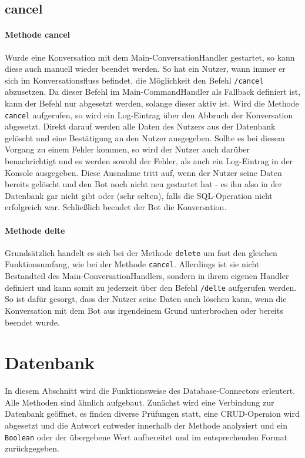         
        \subsection{cancel} \label{cancel.py}
            \paragraph{Methode cancel}
                Wurde eine Konversation mit dem Main-ConversationHandler gestartet, so kann diese auch manuell wieder beendet werden. So hat ein Nutzer, wann immer er sich im Konversationsfluss befindet, die Möglichkeit den Befehl \verb|/cancel| abzusetzen. Da dieser Befehl im Main-CommandHandler als Fallback definiert ist, kann der Befehl nur abgesetzt werden, solange dieser aktiv ist. Wird die Methode \verb|cancel| aufgerufen, so wird ein Log-Eintrag über den Abbruch der Konversation abgesetzt. Direkt darauf werden alle Daten des Nutzers aus der Datenbank gelöscht und eine Bestätigung an den Nutzer ausgegeben. Sollte es bei diesem Vorgang zu einem Fehler kommen, so wird der Nutzer auch darüber benachrichtigt und es werden sowohl der Fehler, als auch ein Log-Eintrag in der Konsole ausgegeben. Diese Ausnahme tritt auf, wenn der Nutzer seine Daten bereits gelöscht und den Bot noch nicht neu gestartet hat - es ihn also in der Datenbank gar nicht gibt oder (sehr selten), falls die SQL-Operation nicht erfolgreich war.
                Schließlich beendet der Bot die Konversation.

            \paragraph{Methode delte}
                Grundsätzlich handelt es sich bei der Methode \verb|delete| um fast den gleichen Funktionsumfang, wie bei der Methode \verb|cancel|. Allerdings ist sie nicht Bestandteil des Main-ConversationHandlers, sondern in ihrem eigenen Handler definiert und kann somit zu jederzeit über den Befehl \verb|/delte| aufgerufen werden. So ist dafür gesorgt, dass der Nutzer seine Daten auch löschen kann, wenn die Konversation mit dem Bot aus irgendeinem Grund unterbrochen oder bereits beendet wurde.


    \section{Datenbank} \label{Datenbank}

        In diesem Abschnitt wird die Funktionsweise des Database-Connectors erleutert. Alle Methoden sind ähnlich aufgebaut. Zunächst wird eine Verbindung zur Datenbank geöffnet, es finden diverse Prüfungen statt, eine CRUD-Operaion wird abgesetzt und die Antwort entweder innerhalb der Methode analysiert und ein \verb|Boolean| oder der übergebene Wert aufbereitet und im entsprechenden Format zurückgegeben.
                
